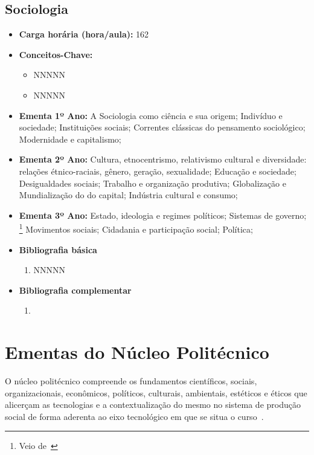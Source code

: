 \documentclass[11pt,fleqn]{book} %
\newcommand{\VER}[1]{\begingroup\color{red}#1\endgroup}
\begin{document}
\subsection{Sociologia}\label{disc:sociologia}
\begin{itemize}
	\item \textbf{Carga horária (hora/aula):} 162
	\item \textbf{Conceitos-Chave:}
	\begin{itemize}
		\item NNNNN
		\item NNNNN
	\end{itemize}
	\item \textbf{Ementa 1º Ano:} 
	A Sociologia como ciência e sua origem; 
	Indivíduo e sociedade; 
	Instituições sociais; 
	Correntes clássicas do pensamento sociológico; 
	Modernidade e capitalismo;
	\item \textbf{Ementa 2º Ano:} 
	Cultura, etnocentrismo, relativismo cultural e diversidade: relações étnico-raciais, gênero, geração, sexualidade;
	Educação e sociedade; 
	Desigualdades sociais; 
	Trabalho e organização produtiva; 
	Globalização e Mundialização do do capital; 
	Indústria cultural e consumo;
	\item \textbf{Ementa 3º Ano:} 
	\VER{	
	Estado, ideologia e regimes políticos; 
	Sistemas de governo;
	}\footnote{Veio de~} 
	Movimentos sociais;
	Cidadania e participação social;
	Política;
	\item \textbf{Bibliografia básica}
	\begin{enumerate}
		\item NNNNN
	\end{enumerate}
	\item \textbf{Bibliografia complementar}
	\begin{enumerate}
		\item 
	\end{enumerate}	
\end{itemize}

\newpage
\section{Ementas do Núcleo Politécnico}\label{ementasPolitecnico}
\indent

O núcleo politécnico compreende os fundamentos científicos, sociais, organizacionais, econômicos, políticos, culturais, ambientais, estéticos e éticos que alicerçam as tecnologias e a contextualização do mesmo no sistema de produção social de forma aderenta ao eixo tecnológico em que se situa o curso~\cite{Resolucao06De2012}.
\end{document}
